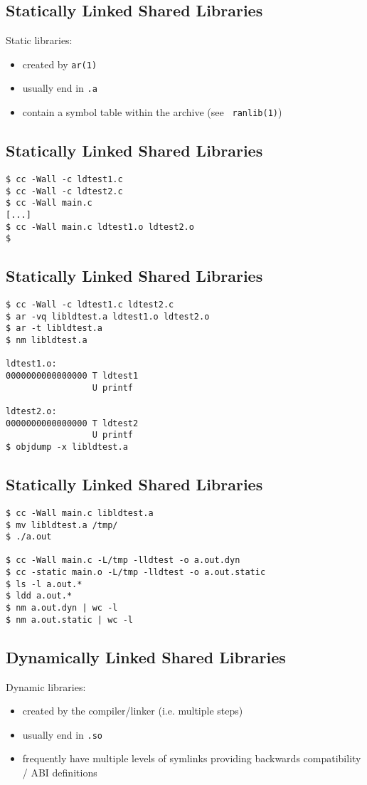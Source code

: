 \documentclass[xga]{xdvislides}
\begin{document}
\subsection{Statically Linked Shared Libraries}
Static libraries:
\begin{itemize}
	\item created by {\tt ar(1)}
	\item usually end in {\tt .a}
	\item contain a symbol table within the archive (see {\tt
		ranlib(1)})
\end{itemize}

\subsection{Statically Linked Shared Libraries}
\begin{verbatim}
$ cc -Wall -c ldtest1.c
$ cc -Wall -c ldtest2.c
$ cc -Wall main.c
[...]
$ cc -Wall main.c ldtest1.o ldtest2.o
$
\end{verbatim}

\subsection{Statically Linked Shared Libraries}
\begin{verbatim}
$ cc -Wall -c ldtest1.c ldtest2.c
$ ar -vq libldtest.a ldtest1.o ldtest2.o
$ ar -t libldtest.a
$ nm libldtest.a

ldtest1.o:
0000000000000000 T ldtest1
                 U printf

ldtest2.o:
0000000000000000 T ldtest2
                 U printf
$ objdump -x libldtest.a
\end{verbatim}

\subsection{Statically Linked Shared Libraries}
\begin{verbatim}
$ cc -Wall main.c libldtest.a
$ mv libldtest.a /tmp/
$ ./a.out

$ cc -Wall main.c -L/tmp -lldtest -o a.out.dyn
$ cc -static main.o -L/tmp -lldtest -o a.out.static
$ ls -l a.out.*
$ ldd a.out.*
$ nm a.out.dyn | wc -l
$ nm a.out.static | wc -l
\end{verbatim}

\subsection{Dynamically Linked Shared Libraries}
Dynamic libraries:
\begin{itemize}
	\item created by the compiler/linker (i.e. multiple steps)
	\item usually end in {\tt .so}
	\item frequently have multiple levels of symlinks providing
		backwards compatibility / ABI definitions
\end{itemize}
\end{document}
